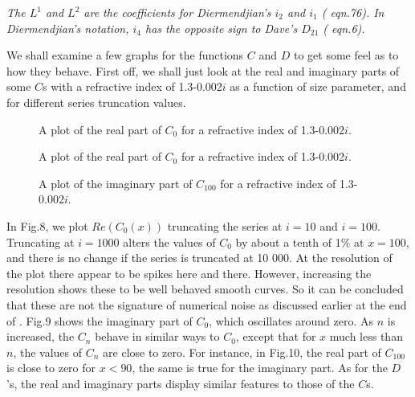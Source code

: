 {\it
 The $L^1$ and $L^2$ are the coefficients
 for Diermendjian's $i_2$ and $i_1$ (\cite{Deirmendjian:Mybib} eqn.76). In Diermendjian's
notation, $i_4$ has the opposite sign to Dave's $D_{21}$ (\cite{Dave2:Mybib} eqn.6). }


We shall examine a few graphs for the functions $C$ and $D$ to get some feel as to how
they behave. First off, we shall just look at the real and imaginary parts of  some $C$s with a refractive
index of 1.3-0.002$i$ as a function of size parameter, and for different series truncation values.


\vspace*{14cm}
\begin{figure}[htb]
\caption{ A plot of the real part of $C_0$ for a refractive index of
1.3-0.002$i$. }
\end{figure}

\vspace*{14cm}
\begin{figure}[htb]
\caption{ A plot of the real part of $C_0$ for a refractive index of
1.3-0.002$i$. }
\end{figure}
\vspace*{14cm}
\begin{figure}[htb]
\caption{ A plot of the imaginary  part of $C_{100}$ for a refractive index of
1.3-0.002$i$. }
\end{figure}

In Fig.8, we plot $Re(C_0(x))$ truncating the series at $i=10$ and $i=100$.
Truncating at $i=1000$ alters the values of $C_0$ by about a tenth of 1\% at $x=100$,
and there is no change if the series is truncated at 10 000.  At the resolution
of the plot there appear to be spikes here and there. However, increasing the resolution
shows these to be well behaved smooth curves. So it can be concluded that these
are not the signature of numerical noise as discussed earlier at the end of .
 Fig.9 shows the imaginary
part of $C_0$, which oscillates around zero. As $n$ is increased, the $C_n$ behave 
in similar ways to $C_0$, except that for $x$  much less than $n$, the values of
$C_n$ are close to zero. For instance, in Fig.10, the real part of $C_{100}$ is close to zero
for $x <90$, the same is true for the imaginary part. As for the $D$'s, the real
and imaginary parts display similar features to those of the $C$s.

